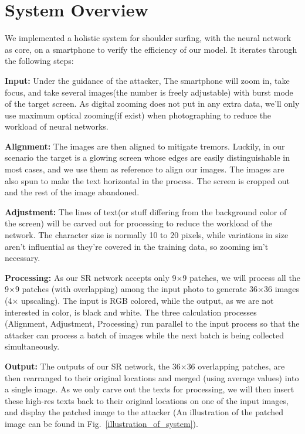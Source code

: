 \section{System Overview}
\label{sec-system-overview} 
We implemented a holistic system for shoulder surfing, with the neural network as core, on a smartphone to verify the efficiency of our model. It iterates through the following steps: 

\vspace{1mm}
\noindent
\textbf{Input:} Under the guidance of the attacker, The smartphone will zoom in, take focus, and take several images(the number is freely adjustable) with burst mode of the target screen. As digital zooming does not put in any extra data, we'll only use maximum optical zooming(if exist) when photographing to reduce the workload of neural networks.

\vspace{1mm}
\noindent
\textbf{Alignment:} The images are then aligned to mitigate tremors. Luckily, in our scenario the target is a glowing screen whose edges are easily distinguishable in most cases, and we use them as reference to align our images. The images are also spun to make the text horizontal in the process. The screen is cropped out and the rest of the image abandoned.


\vspace{1mm}
\noindent
\textbf{Adjustment:} The lines of text(or stuff differing from the background color of the screen) will be carved out for processing to reduce the workload of the network. The character size is normally 10 to 20 pixels, while variations in size aren't influential as they're covered in the training data, so zooming isn't necessary.

\vspace{1mm}
\noindent
\textbf{Processing:} As our SR network accepts only 9$\times$9 patches, we will process all the 9$\times$9 patches (with overlapping) among the input photo to generate 36$\times$36 images (4$\times$ upscaling). The input is RGB colored, while the output, as we are not interested in color, is black and white. The three calculation processes (Alignment, Adjustment, Processing) run parallel to the input process so that the attacker can process a batch of images while the next batch is being collected simultaneously.
		
\vspace{1mm}
\noindent
\textbf{Output:} The outputs of our SR network, the 36$\times$36 overlapping patches, are then rearranged to their original locations and merged (using average values) into a single image. As we only carve out the texts for processing, we will then insert these high-res texts back to their original locations on one of the input images, and display the patched image to the attacker (An illustration of the patched image can be found in Fig.~\ref{illustration_of_system}).


